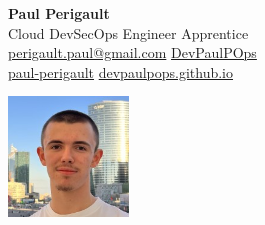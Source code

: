 \begin{minipage}{0.7\textwidth}
{\Huge\bfseries\color{mainblue} Paul Perigault}
    \\[0.4cm]
    {\Large\color{darkgray} Cloud DevSecOps Engineer Apprentice }\\[0.5cm]
    \large
    \icon{\faEnvelope} \href{mailto:perigault.paul@gmail.com}{perigault.paul@gmail.com} \quad
    \icon{\faGithub} \href{https://github.com/DevPaulPOps}{DevPaulPOps}\\[0.2cm]
    \icon{\faLinkedin} \href{https://linkedin.com/in/paul-perigault}{paul-perigault} \quad
    \icon{\faGlobe} \href{https://devpaulpops.github.io/}{devpaulpops.github.io}
\end{minipage}
\begin{minipage}{0.3\textwidth}
    \raggedleft
    \includegraphics[width=3.2cm]{assets/photo}
\end{minipage}
\vspace{0.3cm}